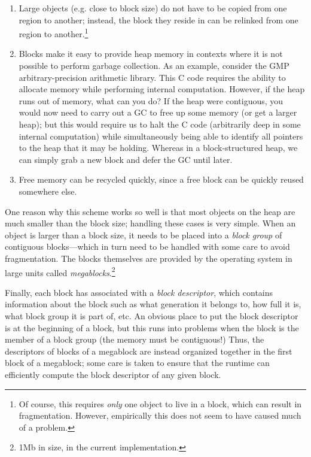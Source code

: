 \begin{enumerate}
    \item Large objects (e.g. close to block size) do not have to be copied from one region to
        another; instead, the block they reside in can be relinked from
        one region to another.\footnote{Of course, this requires \emph{only}
        one object to live in a block, which can result in fragmentation.
        However, empirically this does not seem to have caused much of a problem.}
    \item Blocks make it easy to provide heap memory in contexts where it is
        not possible to perform garbage collection.  As an example, consider
        the GMP arbitrary-precision arithmetic library.  This C code requires
        the ability to allocate memory while performing internal computation.
        However, if the heap runs out of memory, what can you do?  If the heap
        were contiguous, you would now need to carry out a GC to free up some memory
        (or get a larger heap); but this would require us to halt the C code
        (arbitrarily deep in some internal computation) while simultaneously being
        able to identify all pointers to the heap that it may be holding.  Whereas
        in a block-structured heap, we can simply grab a new block and defer the GC
        until later.
    \item Free memory can be recycled quickly, since a free block can be quickly
        reused somewhere else.
\end{enumerate}

One reason why this scheme works so well is that most objects on the
heap are much smaller than the block size; handling these cases is very
simple.  When an object is larger than a block size, it needs to be
placed into a \emph{block group} of contiguous blocks---which in turn
need to be handled with some care to avoid fragmentation.  The blocks
themselves are provided by the operating system in large units called
\emph{megablocks}.\footnote{1Mb in size, in the current implementation.}

Finally, each block has associated with a \emph{block descriptor}, which
contains information about the block such as what generation it belongs to, how full it is, what block
group it is part of, etc.  An obvious place to put the block descriptor
is at the beginning of a block, but this runs into problems when the block
is the member of a block group (the memory must be contiguous!)
Thus, the descriptors of blocks of a megablock are instead organized together
in the first block of a megablock; some care is taken to ensure that the
runtime can efficiently compute the block descriptor of any given block.

